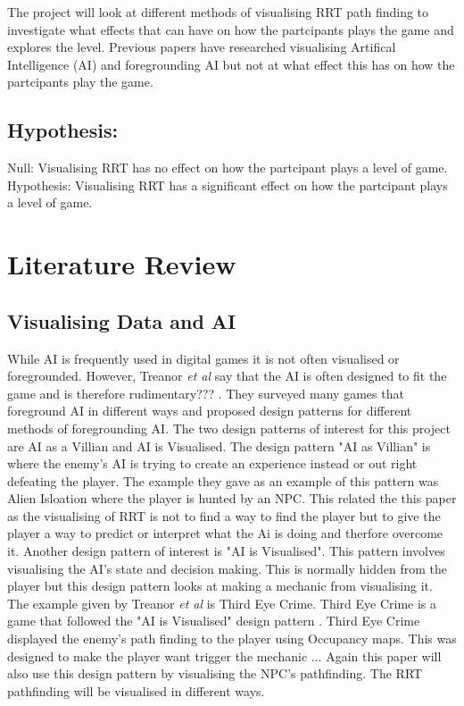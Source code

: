 \documentclass[journal]{IEEEtran}
\begin{document}
The project will look at different methods of visualising RRT path finding to investigate what effects that can have on how the partcipants plays the game and explores the level.  Previous papers have researched visualising Artifical Intelligence (AI) and foregrounding AI but not at what effect this has on how the partcipants play the game.


\subsection{Hypothesis:}
Null: Visualising RRT has no effect on how the partcipant plays a level of game. \\
Hypothesis: Visualising RRT has a significant effect on how the partcipant plays a level of game. 


\section{Literature Review}
\subsection{Visualising Data and AI}
While AI is frequently used in digital games it is not often visualised or foregrounded. However, Treanor \textit{et al} say that the AI is often designed to fit the game and is therefore rudimentary??? \cite{treanor2015}.
They surveyed many games that foreground AI in different ways and proposed design patterns for different methods of foregrounding AI. The two design patterns of interest for this project are AI as a Villian and AI is Visualised. The design pattern "AI as Villian" is where the enemy's AI is trying to create an experience instead or out right defeating the player. The example they gave as an example of this pattern was Alien Isloation where the player is hunted by an NPC.  This related the this paper as the visualising of RRT is not to find a way to find the player but to give the player a way to predict or interpret what the Ai is doing and therfore overcome it.
Another design pattern of interest is "AI is Visualised". This pattern involves visualising the AI's state and decision making. This is normally hidden from the player but this design pattern looks at making a mechanic from visualising it. The example given by Treanor \textit{et al} is Third Eye Crime.  Third Eye Crime is a game that followed the "AI is Visualised" design pattern \cite{Isla2014}.  Third Eye Crime displayed the enemy's path finding to the player using Occupancy maps.  
This was designed to make the player want trigger the mechanic ...  Again this paper will also use this design pattern by visualising the NPC's pathfinding.  The RRT pathfinding will be visualised in different ways.
\end{document}
